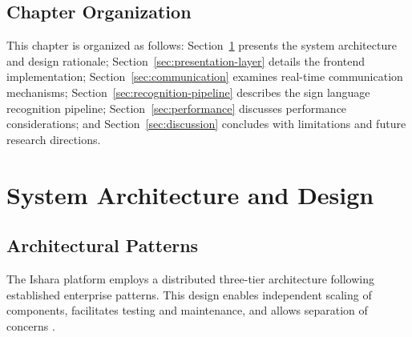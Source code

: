 \documentclass[11pt,a4paper,twoside]{report}
\begin{document}
\subsection{Chapter Organization}
\label{subsec:chapter-organization}

This chapter is organized as follows: Section~\ref{sec:architecture} presents the system architecture and design rationale; Section~\ref{sec:presentation-layer} details the frontend implementation; Section~\ref{sec:communication} examines real-time communication mechanisms; Section~\ref{sec:recognition-pipeline} describes the sign language recognition pipeline; Section~\ref{sec:performance} discusses performance considerations; and Section~\ref{sec:discussion} concludes with limitations and future research directions.

\newpage

\section{System Architecture and Design}
\label{sec:architecture}

\subsection{Architectural Patterns}
\label{subsec:architecture-patterns}

The Ishara platform employs a distributed three-tier architecture following established enterprise patterns. This design enables independent scaling of components, facilitates testing and maintenance, and allows separation of concerns \cite{Sommerville2015}.
\end{document}
